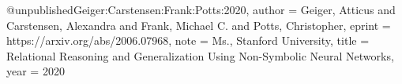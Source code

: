 @unpublished{Geiger:Carstensen:Frank:Potts:2020,
	author = {Geiger, Atticus and Carstensen, Alexandra and Frank, Michael C. and Potts, Christopher},
	eprint = {https://arxiv.org/abs/2006.07968},
	note = {Ms., Stanford University},
	title = {Relational Reasoning and Generalization Using Non-Symbolic Neural Networks},
	year = {2020}}
